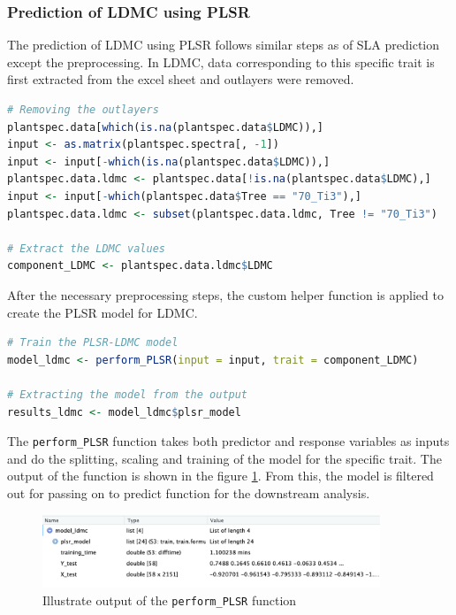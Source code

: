 \documentclass[12pt,a4paper]{report}
\begin{document}
\subsubsection*{Prediction of LDMC using PLSR}
The prediction of LDMC using PLSR follows similar steps as of SLA prediction except the preprocessing. In LDMC, data corresponding to this specific trait is first extracted from the excel sheet and outlayers were removed. \\

\begin{lstlisting}[language=R, style=mystyle]
# Removing the outlayers
plantspec.data[which(is.na(plantspec.data$LDMC)),]
input <- as.matrix(plantspec.spectra[, -1])
input <- input[-which(is.na(plantspec.data$LDMC)),]
plantspec.data.ldmc <- plantspec.data[!is.na(plantspec.data$LDMC),]
input <- input[-which(plantspec.data$Tree == "70_Ti3"),]
plantspec.data.ldmc <- subset(plantspec.data.ldmc, Tree != "70_Ti3")

# Extract the LDMC values
component_LDMC <- plantspec.data.ldmc$LDMC
\end{lstlisting}

After the necessary preprocessing steps, the custom helper function is applied to create the PLSR model for LDMC. \\

\begin{lstlisting}[language=R, style=mystyle]
# Train the PLSR-LDMC model
model_ldmc <- perform_PLSR(input = input, trait = component_LDMC)

# Extracting the model from the output
results_ldmc <- model_ldmc$plsr_model
\end{lstlisting}

The \texttt{perform\_PLSR} function takes both predictor and response variables as inputs and do the splitting, scaling and training of the model for the specific trait. The output of the function is shown in the figure \ref{fig:model_ldmc}. From this, the model is filtered out for passing on to predict function for the downstream analysis.

\begin{figure}[h]
    \centering
    \includegraphics[width=0.9\textwidth]{Figures/model_ldmc.png}
    \caption{Illustrate output of the \texttt{perform\_PLSR} function}
    \label{fig:model_ldmc}
\end{figure}
\end{document}
